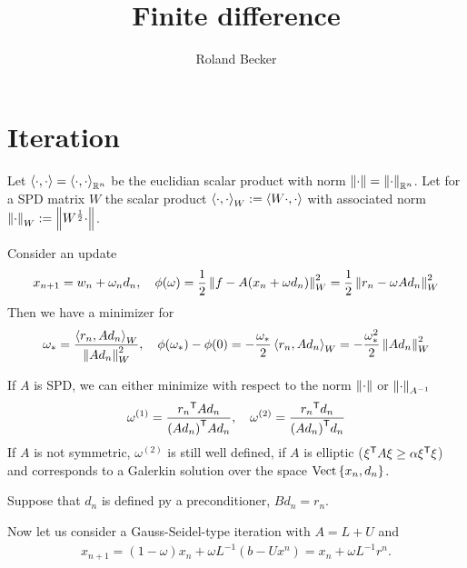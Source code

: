\documentclass[12pt, english]{article}
\title{Finite difference}
\author{Roland Becker}
\begin{document}
\maketitle
%
%
\section{Iteration}\label{sec:}
%
Let $\left\langle\cdot,\cdot\right\rangle=\left\langle\cdot,\cdot\right\rangle_{\mathbb R^n}$ be the euclidian scalar product with norm $\left\|\cdot\right\|=\left\|\cdot\right\|_{\mathbb R^n}$. Let for a SPD matrix $W$ the scalar product $\left\langle\cdot,\cdot\right\rangle_W:=\left\langle W\cdot,\cdot\right\rangle$ with associated norm $\left\|\cdot\right\|_W := \left\|W^{\frac12}\cdot\right\|$.

Consider an update
%
\begin{equation}\label{eq:}
x_{n+1} = w_n + \omega_n d_n,\quad \phi(\omega) = \frac12\left\|f - A (x_n + \omega d_n)\right\|_W^2
= \frac12\left\|r_n - \omega Ad_n\right\|_W^2
\end{equation}
%
Then we have a minimizer for
%
\begin{equation}\label{eq:}
\omega_{*} = \frac{\left\langle r_n,Ad_n\right\rangle_W}{\left\|Ad_n\right\|^2_W},\quad \phi(\omega_*)-\phi(0) =
- \frac{\omega_*}{2}\left\langle r_n,Ad_n\right\rangle_W = - \frac{\omega_*^2}{2}\left\|Ad_n\right\|^2_W
\end{equation}
%

If $A$ is SPD, we can either minimize with respect to the norm $\left\|\cdot\right\|$ or $\left\|\cdot\right\|_{A^{-1}}$
%
\begin{align*}
\omega^{(1)} = \frac{{r_n}^{\mathsf{T}}{Ad_n}}{{(Ad_n)}^{\mathsf{T}}{Ad_n}},\quad
\omega^{(2)} = \frac{{r_n}^{\mathsf{T}}{d_n}}{{(Ad_n)}^{\mathsf{T}}{d_n}}
\end{align*}
%
If $A$ is not symmetric, $\omega^{(2)}$ is still well defined, if $A$ is elliptic (${\xi}^{\mathsf{T}}A\xi\ge \alpha{\xi}^{\mathsf{T}}\xi$) and corresponds to a Galerkin solution over the space $\operatorname{Vect}\left\{x_n, d_n\right\}$.

Suppose that $d_n$ is defined py a preconditioner, $B d_n = r_n$.





Now let us consider a Gauss-Seidel-type iteration with $A=L+U$ and
%
\begin{align*}
x_{n+1} = (1-\omega)x_n + \omega L^{-1}(b- U x^n) = x_n +  \omega L^{-1}r^n.
\end{align*}
%


%
\end{document}
